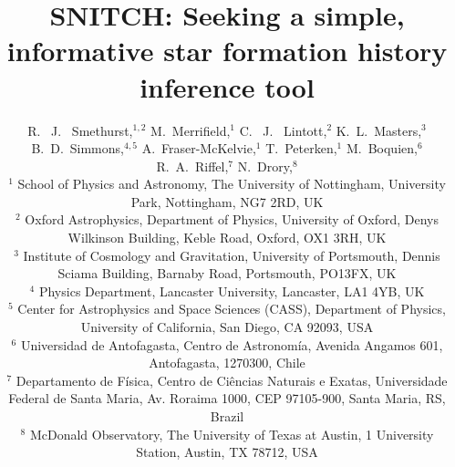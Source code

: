 \documentclass[useAMS,usenatbib]{mn2e}
\begin{document}
\title[\textsc{snitch}: inferring informative  SFHs]{SNITCH: Seeking a simple, informative star formation history inference tool}
\author[Smethurst et al. 2018]{R. ~J. ~Smethurst,$^{1,2}$ M.~Merrifield,$^{1}$ C. ~J. ~Lintott,$^{2}$ K.~L.~Masters,$^{3}$ \newauthor B.~D.~Simmons,$^{4,5}$ A.~Fraser-McKelvie,$^{1}$ T.~Peterken,$^{1}$ M.~Boquien,$^{6}$ \newauthor R.~A.~Riffel,$^{7}$ N.~Drory,$^{8}$
\\ $^1$ School of Physics and Astronomy, The University of Nottingham, University Park, Nottingham, NG7 2RD, UK
\\ $^2$ Oxford Astrophysics, Department of Physics, University of Oxford, Denys Wilkinson Building, Keble Road, Oxford, OX1 3RH, UK
\\ $^3$ Institute of Cosmology and Gravitation, 
University of Portsmouth, Dennis Sciama Building, Barnaby Road, Portsmouth, PO13FX, UK
\\ $^4$ Physics Department, Lancaster University, Lancaster, LA1 4YB, UK
\\ $^5$ Center for Astrophysics and Space Sciences (CASS), Department of Physics, University of California, San Diego, CA 92093, USA
\\ $^6$ Universidad de Antofagasta, Centro de Astronom\'ia, Avenida Angamos 601, Antofagasta, 1270300, Chile
\\ $^7$ Departamento de Física, Centro de Ciências Naturais e Exatas,  Universidade Federal de Santa Maria, Av. Roraima 1000, CEP 97105-900, Santa Maria, RS, Brazil 
\\ $^8$ McDonald Observatory, The University of Texas at Austin, 1 University Station, Austin, TX 78712, USA
}

\maketitle
\end{document}
